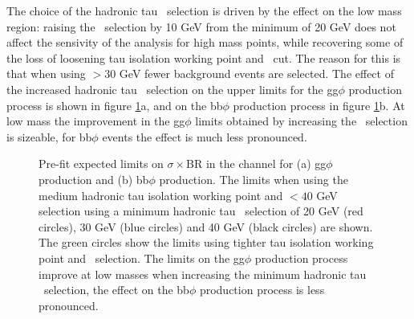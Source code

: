 The choice of the hadronic tau \pT~selection is driven by the effect on the low mass region:
raising the \pT~selection by 10 GeV from the minimum of 20 GeV does not affect the sensivity
of the analysis for high mass points, while recovering some of the loss of loosening 
tau isolation working point and \mT~cut. The reason for this is that when using \pT$>30$ GeV 
fewer background events are selected. The effect of the increased hadronic tau \pT~selection on the 
upper limits for the gg$\phi$ production process is shown
in figure \ref{fig:mssm_tauptcut}a, and on the bb$\phi$ production process
in figure \ref{fig:mssm_tauptcut}b. At low mass the improvement in the gg$\phi$ limits
obtained by increasing the \pT~selection is sizeable, for bb$\phi$ events the effect is much
less pronounced.

\begin{figure}[h!]
\begin{center}
\end{center}
\caption[Pre-fit expected limits on $\sigma\times$BR in the
\mutau channel for gg$\phi$ and bb$\phi$ prouduction, comparing
different hadronic tau \pT~cuts.]{Pre-fit expected limits on $\sigma\times$BR in the \mutau channel for (a) gg$\phi$ production and (b) bb$\phi$ production. The
limits when using the medium hadronic tau isolation working point and \mT$<40$ GeV selection using a minimum
hadronic tau \pT~selection of 20 GeV (red circles), 30 GeV (blue circles) and 40 GeV (black circles) are shown. The green
circles show the limits using tighter tau isolation working point and \mT~selection. The limits on
the gg$\phi$ production process improve at low masses when increasing the minimum hadronic tau \pT~selection,
the effect on the bb$\phi$ production process is less pronounced.}
\label{fig:mssm_tauptcut}
\end{figure}

